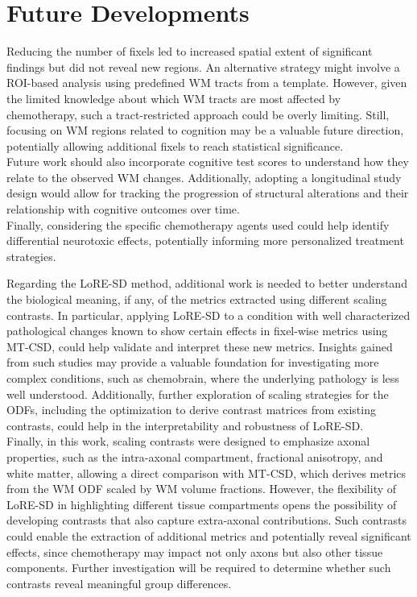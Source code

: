 \section{Future Developments}
Reducing the number of fixels led to increased spatial extent of significant findings but did not reveal new regions. An alternative strategy might involve a ROI-based analysis using predefined WM tracts from a template. However, given the limited knowledge about which WM tracts are most affected by chemotherapy, such a tract-restricted approach could be overly limiting. Still, focusing on WM regions related to cognition may be a valuable future direction, potentially allowing additional fixels to reach statistical significance.
\\Future work should also incorporate cognitive test scores to understand how they relate to the observed WM changes. Additionally, adopting a longitudinal study design would allow for tracking the progression of structural alterations and their relationship with cognitive outcomes over time.
\\Finally, considering the specific chemotherapy agents used could help identify differential neurotoxic effects, potentially informing more personalized treatment strategies.

Regarding the LoRE-SD method, additional work is needed to better understand the biological meaning, if any, of the metrics extracted using different scaling contrasts. In particular, applying LoRE-SD to a condition with well characterized pathological changes known to show certain effects in fixel-wise metrics using MT-CSD, could help validate and interpret these new metrics. Insights gained from such studies may provide a valuable foundation for investigating more complex conditions, such as chemobrain, where the underlying pathology is less well understood. Additionally, further exploration of scaling strategies for the ODFs, including the optimization to derive contrast matrices from existing contrasts, could help in the interpretability and robustness of LoRE-SD. 
\\Finally, in this work, scaling contrasts were designed to emphasize axonal properties, such as the intra-axonal compartment, fractional anisotropy, and white matter, allowing a direct comparison with MT-CSD, which derives metrics from the WM ODF scaled by WM volume fractions. However, the flexibility of LoRE-SD in highlighting different tissue compartments opens the possibility of developing contrasts that also capture extra-axonal contributions. Such contrasts could enable the extraction of additional metrics and potentially reveal significant effects, since chemotherapy may impact not only axons but also other tissue components. Further investigation will be required to determine whether such contrasts reveal meaningful group differences.



